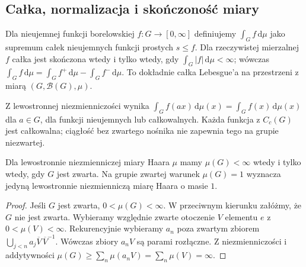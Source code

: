 \subsection*{Całka, normalizacja i skończoność miary}
\begin{definicja}
Dla nieujemnej funkcji borelowskiej $f:G\to[0,\infty]$ definiujemy $\int_G f\,\mathrm d\mu$ jako supremum całek nieujemnych funkcji prostych $s\le f$. Dla rzeczywistej mierzalnej $f$ całka jest skończona wtedy i tylko wtedy, gdy $\int_G|f|\,\mathrm d\mu<\infty$; wówczas $\int_Gf\,\mathrm d\mu=\int_Gf^+\,\mathrm d\mu-\int_Gf^-\,\mathrm d\mu$. To dokładnie całka Lebesgue'a na przestrzeni z miarą $(G,\mathcal B(G),\mu)$.
\end{definicja}
Z lewostronnej niezmienniczości wynika $\int_G f(ax)\,\mathrm d\mu(x)=\int_Gf(x)\,\mathrm d\mu(x)$ dla $a\in G$, dla funkcji nieujemnych lub całkowalnych. Każda funkcja z $C_c(G)$ jest całkowalna; ciągłość bez zwartego nośnika nie zapewnia tego na grupie niezwartej.
\begin{twierdzenie}
Dla lewostronnie niezmienniczej miary Haara $\mu$ mamy $\mu(G)<\infty$ wtedy i tylko wtedy, gdy $G$ jest zwarta. Na grupie zwartej warunek $\mu(G)=1$ wyznacza jedyną lewostronnie niezmienniczą miarę Haara o masie $1$.
\end{twierdzenie}
\begin{proof}
Jeśli $G$ jest zwarta, $0<\mu(G)<\infty$. W przeciwnym kierunku załóżmy, że $G$ nie jest zwarta. Wybieramy względnie zwarte otoczenie $V$ elementu $e$ z $0<\mu(V)<\infty$. Rekurencyjnie wybieramy $a_n$ poza zwartym zbiorem $\bigcup_{j<n}a_j\overline V\,\overline V^{-1}$. Wówczas zbiory $a_nV$ są parami rozłączne. Z niezmienniczości i addytywności $\mu(G)\ge\sum_n\mu(a_nV)=\sum_n\mu(V)=\infty$.
\end{proof}
